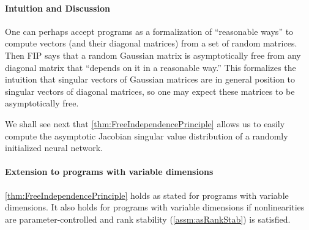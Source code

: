 \documentclass[main.tex]{subfiles}
\begin{document}
\paragraph*{Intuition and Discussion}
One can perhaps accept \netsort{} programs as a formalization of ``reasonable ways'' to compute vectors (and their diagonal matrices) from a set of random matrices.
Then FIP says that a random Gaussian matrix is asymptotically free from any diagonal matrix that ``depends on it in a reasonable way.''
This formalizes the intuition that singular vectors of Gaussian matrices are in general position to singular vectors of diagonal matrices, so one may expect these matrices to be asymptotically free.

We shall see next that \cref{thm:FreeIndependencePrinciple} allows us to easily compute the asymptotic Jacobian singular value distribution of a randomly initialized neural network. 

\paragraph{Extension to \netsortplus{} programs with variable dimensions}
\cref{thm:FreeIndependencePrinciple} holds as stated for \netsort{} programs with variable dimensions.
It also holds for \netsortplus{} programs with variable dimensions if nonlinearities are parameter-controlled and rank stability (\cref{assm:asRankStab}) is satisfied.
\end{document}
